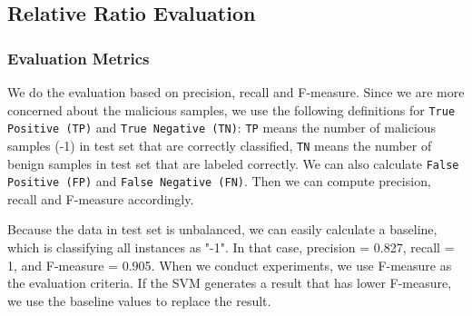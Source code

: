 \documentclass[11pt]{article}
\begin{document}

\subsection{Relative Ratio Evaluation}
\subsubsection{Evaluation Metrics}
We do the evaluation based on precision, recall and F-measure. Since we are more concerned about the malicious samples, we use the following definitions for \texttt{True Positive (TP)} and \texttt{True Negative (TN)}: \texttt{TP} means the number of malicious samples (-1) in test set that are correctly classified, \texttt{TN} means the number of benign samples in test set that are labeled correctly. We can also calculate \texttt{False Positive (FP)} and \texttt{False Negative (FN)}. Then we can compute precision, recall and F-measure accordingly.

Because the data in test set is unbalanced, we can easily calculate a baseline, which is classifying all instances as "-1". In that case, precision = 0.827, recall = 1, and F-measure = 0.905. When we conduct experiments, we use F-measure as the evaluation criteria. If the SVM generates a result that has lower F-measure, we use the baseline values to replace the result.
\end{document}
